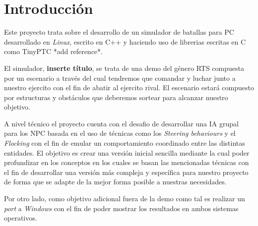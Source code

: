 \chapter{Introducción}
\label{intro}
Este proyecto trata sobre el desarrollo de un simulador de batallas para \ac{PC}
desarrollado en \textit{Linux}, escrito en C++ y haciendo uso de librerias escritas en
C como TinyPTC *add reference*.

El simulador, \textbf{inserte título}, se trata de una demo del género \ac{RTS}
compuesta por un escenario a través del cual tendremos que comandar y luchar junto a
nuestro ejercito con el fin de abatir al ejercito rival. El escenario estará compuesto
por estructuras y obstáculos que deberemos sortear para alcanzar nuestro objetivo.

A nivel técnico el proyecto cuenta con el desafio de desarrollar una \ac{IA} grupal
para los \ac{NPC} basada en el uso de técnicas como los \textit{Steering behaviours} 
y el \textit{Flocking} con el fin de emular un comportamiento coordinado entre las
distintas entidades. El objetivo es crear una versión inicial sencilla mediante la 
cual poder profundizar en los conceptos en los cuales se basan las mencionadas técnicas
con el fin de desarrollar una versión más compleja y específica para nuestro proyecto
de forma que se adapte de la mejor forma posible a nuestras necesidades.

Por otro lado, como objetivo adicional fuera de la demo como tal es realizar
un \textit{port} a \textit{Windows} con el fin de poder mostrar los resultados
en ambos sistemas operativos.



